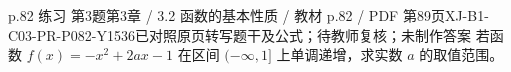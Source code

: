 \par\noindent\begin{minipage}{\linewidth}
\begin{bankitem}{p.82 练习 第3题}{第3章 / 3.2 函数的基本性质 / 教材 p.82 / PDF 第89页}{XJ-B1-C03-PR-P082-Y1536}{已对照原页转写题干及公式；待教师复核；未制作答案}
若函数 $f(x)=-x^2+2ax-1$ 在区间 $(-\infty,1]$ 上单调递增，求实数 $a$ 的取值范围。
\end{bankitem}
\end{minipage}\par\medskip
